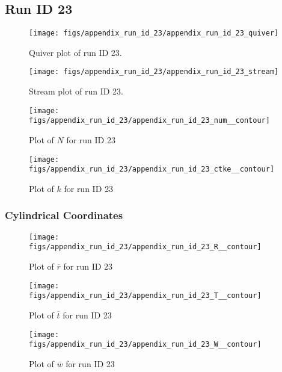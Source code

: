 \subsection{Run ID 23}
\begin{figure}[H]
\centering
\texttt{[image: figs/appendix\_run\_id\_23/appendix\_run\_id\_23\_quiver]}
\caption{Quiver plot of run ID 23.}
\label{fig:appendix_run_id_23_quiver}
\end{figure}


\begin{figure}[H]
\centering
\texttt{[image: figs/appendix\_run\_id\_23/appendix\_run\_id\_23\_stream]}
\caption{Stream plot of run ID 23.}
\label{fig:appendix_run_id_23_stream}
\end{figure}


\begin{figure}[H]
\centering
\texttt{[image: figs/appendix\_run\_id\_23/appendix\_run\_id\_23\_num\_\_contour]}
\caption{Plot of $N$ for run ID 23}
\label{fig:appendix_run_id_23_num__contour}
\end{figure}


\begin{figure}[H]
\centering
\texttt{[image: figs/appendix\_run\_id\_23/appendix\_run\_id\_23\_ctke\_\_contour]}
\caption{Plot of $k$ for run ID 23}
\label{fig:appendix_run_id_23_ctke__contour}
\end{figure}


\subsubsection{Cylindrical Coordinates}
\begin{figure}[H]
\centering
\texttt{[image: figs/appendix\_run\_id\_23/appendix\_run\_id\_23\_R\_\_contour]}
\caption{Plot of $\overline{r}$ for run ID 23}
\label{fig:appendix_run_id_23_R__contour}
\end{figure}


\begin{figure}[H]
\centering
\texttt{[image: figs/appendix\_run\_id\_23/appendix\_run\_id\_23\_T\_\_contour]}
\caption{Plot of $\overline{t}$ for run ID 23}
\label{fig:appendix_run_id_23_T__contour}
\end{figure}


\begin{figure}[H]
\centering
\texttt{[image: figs/appendix\_run\_id\_23/appendix\_run\_id\_23\_W\_\_contour]}
\caption{Plot of $\overline{w}$ for run ID 23}
\label{fig:appendix_run_id_23_W__contour}
\end{figure}


